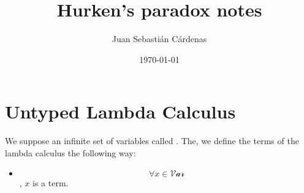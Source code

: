 \documentclass[11pt]{article}
\title{Hurken's paradox notes}
\author{Juan Sebastián Cárdenas}
\date{\today}
\begin{document}
\maketitle
\section{Untyped Lambda Calculus}
We suppose an infinite set of variables called . The, we define the terms of the lambda calculus the following way:
\begin{itemize}
  \item $$\forall x \in \mathcal{Var}$$, $x$ is a term.
\end{itemize}
\end{document}
